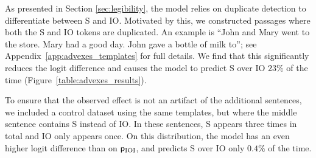 As presented in Section \ref{sec:legibility}, the model relies on duplicate detection to differentiate between S and IO. %
Motivated by this, we constructed passages where both the S and IO tokens are duplicated. An example is ``John and Mary went to the store. Mary had a good day. John gave a bottle of milk to''; see Appendix~\ref{app:advexes_templates} for full details. We find that this significantly reduces the logit difference and causes the model to predict S over IO $23\%$ of the time (Figure~\ref{table:advexes_results}).

To ensure that the observed effect is not an artifact of the additional sentences, we included a control dataset using the same templates, but where the middle sentence contains S instead of IO. In these sentences, S appears three times in total and IO only appears once. On this distribution, the model has an even higher logit difference than on $\mathsf{p}_{\mathrm{IOI}}$, and predicts S over IO only $0.4\%$ of the time.






